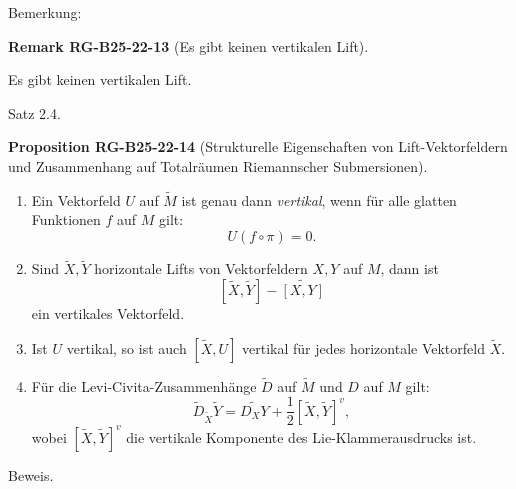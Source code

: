 \documentclass[10pt, letterpaper]{article}
\newcommand{\CustomHeading}[3]{%
  \par\medskip\noindent%
  \textbf{#1 #2} \textnormal{(#3)}.\enskip%
}
\newenvironment{PROP}[2]{\begin{unitbox}\CustomHeading{Proposition}{#1}{#2}}{\end{unitbox}}
\newenvironment{REM}[2]{\begin{unitbox}\CustomHeading{Remark}{#1}{#2}}{\end{unitbox}}
\begin{document}
Bemerkung: 

\begin{REM}{RG-B25-22-13}{Es gibt keinen vertikalen Lift}
Es gibt keinen vertikalen Lift.
\end{REM}


Satz 2.4. 

\begin{PROP}{RG-B25-22-14}{Strukturelle Eigenschaften von Lift-Vektorfeldern und Zusammenhang auf Totalräumen Riemannscher Submersionen}
\begin{enumerate}
  \item Ein Vektorfeld $U$ auf $\tilde{M}$ ist genau dann \emph{vertikal}, wenn für alle glatten Funktionen $f$ auf $M$ gilt:
  \[
  U(f \circ \pi) = 0.
  \]

  \item Sind $\tilde{X}, \tilde{Y}$ horizontale Lifts von Vektorfeldern $X, Y$ auf $M$, dann ist
  \[
  [\tilde{X}, \tilde{Y}] - \widetilde{[X, Y]}
  \]
  ein vertikales Vektorfeld.

  \item Ist $U$ vertikal, so ist auch $[\tilde{X}, U]$ vertikal für jedes horizontale Vektorfeld $\tilde{X}$.

  \item Für die Levi-Civita-Zusammenhänge $\tilde{D}$ auf $\tilde{M}$ und $D$ auf $M$ gilt:
  \[
  \tilde{D}_{\tilde{X}} \tilde{Y} = \widetilde{D_X Y} + \frac{1}{2} [\tilde{X}, \tilde{Y}]^{v},
  \]
  wobei $[\tilde{X}, \tilde{Y}]^{v}$ die vertikale Komponente des Lie-Klammerausdrucks ist.
\end{enumerate}
\end{PROP}



Beweis. 
\end{document}
